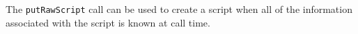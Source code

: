 The \verb+putRawScript+ call can be used to create a script when all of the
information associated with the script is known at call time.
